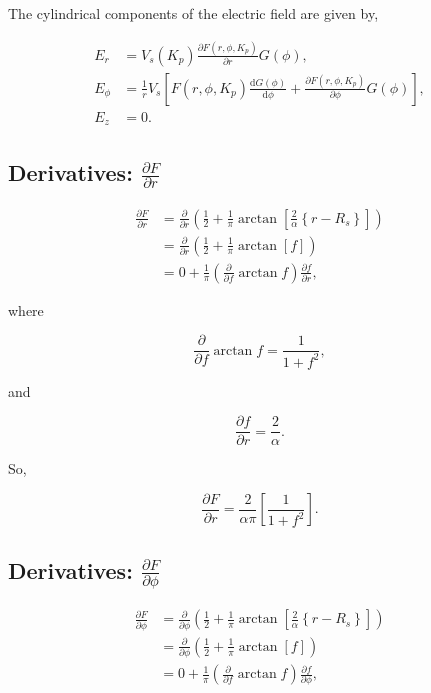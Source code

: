 \documentclass[]{article}
\begin{document}
	The cylindrical components of the electric field are given by,
	
	\begin{align}
		E_r &= V_s(K_p)\frac{\partial F(r,\phi,K_p)}{\partial r} G(\phi),\\
		E_\phi &= \frac{1}{r} V_s \left[ F(r,\phi,K_p)\frac{\text{d} G(\phi)}{\text{d} \phi} + \frac{\partial F(r,\phi,K_p)}{\partial \phi} G(\phi) \right],\\
		E_z &= 0.
	\end{align}
	
	\subsection{Derivatives: $\frac{\partial F}{\partial r}$}
		\begin{align}
			\frac{\partial F}{\partial r} &= \frac{\partial}{\partial r} \left(\frac{1}{2} + \frac{1}{\pi}\arctan{\left[\frac{2}{\alpha}\left\{r - R_s\right\}\right]}\right) \\
			&= \frac{\partial}{\partial r}\left(\frac{1}{2} + \frac{1}{\pi}\arctan\left[f\right]\right) \\
			&= 0 + \frac{1}{\pi}\left(\frac{\partial}{\partial f}\arctan{f}\right)\frac{\partial f}{\partial r},
		\end{align}
		
		where
		
		\begin{equation}
			\frac{\partial }{\partial f} \arctan{f} = \frac{1}{1 + f^2},
		\end{equation}
		
		and
		
		\begin{equation}
			\frac{\partial f}{\partial r} = \frac{2}{\alpha}.
		\end{equation}
		
		So,
		
		\begin{equation}
			\boxed{\frac{\partial F}{\partial r} = \frac{2}{\alpha \pi} \left[\frac{1}{1 + f^2}\right].}
		\end{equation}
	
	\subsection{Derivatives: $\frac{\partial F}{\partial \phi}$}
		
		\begin{align}
			\frac{\partial F}{\partial \phi} &= \frac{\partial}{\partial \phi} \left(\frac{1}{2} + \frac{1}{\pi}\arctan{\left[\frac{2}{\alpha}\left\{r - R_s\right\}\right]}\right) \\
			&= \frac{\partial}{\partial \phi}\left(\frac{1}{2} + \frac{1}{\pi}\arctan\left[f\right]\right) \\
			&= 0 + \frac{1}{\pi}\left(\frac{\partial}{\partial f}\arctan{f}\right)\frac{\partial f}{\partial \phi},
		\end{align}
		
\end{document}
